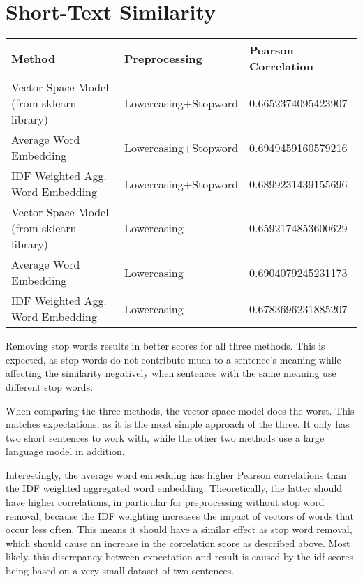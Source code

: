 \section{Short-Text Similarity}

\begin{table}[h]
\center
\begin{tabular}{|l|l|l|}
\hline
\textbf{Method}                           & \textbf{Preprocessing} & \textbf{Pearson Correlation} \\ \hline
Vector Space Model (from sklearn library) & Lowercasing+Stopword   & 0.6652374095423907           \\ \hline
Average Word Embedding                    & Lowercasing+Stopword   & 0.6949459160579216           \\ \hline
IDF Weighted Agg. Word Embedding          & Lowercasing+Stopword   & 0.6899231439155696           \\ \hline
Vector Space Model (from sklearn library) & Lowercasing            & 0.6592174853600629           \\ \hline
Average Word Embedding                    & Lowercasing            & 0.6904079245231173           \\ \hline
IDF Weighted Agg. Word Embedding          & Lowercasing            & 0.6783696231885207           \\ \hline
\end{tabular}
\end{table}

Removing stop words results in better scores for all three methods.
This is expected, as stop words do not contribute much to a sentence's meaning while affecting the similarity negatively when sentences with the same meaning use different stop words.

When comparing the three methods, the vector space model does the worst.
This matches expectations, as it is the most simple approach of the three.
It only has two short sentences to work with, while the other two methods use a large language model in addition.

Interestingly, the average word embedding has higher Pearson correlations than the IDF weighted aggregated word embedding.
Theoretically, the latter should have higher correlations, in particular for preprocessing without stop word removal, because the IDF weighting increases the impact of vectors of words that occur less often.
This means it should have a similar effect as stop word removal, which should cause an increase in the correlation score as described above.
Most likely, this discrepancy between expectation and result is caused by the idf scores being based on a very small dataset of two sentences.
